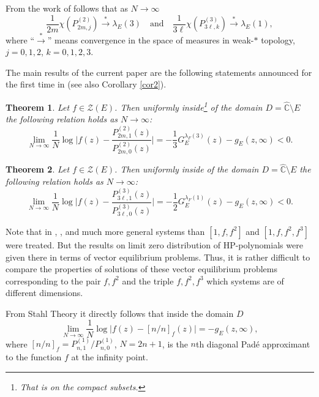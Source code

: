\documentclass[11pt, a4paper, twoside]{article}
\let\myh\widehat
\def\CC{\mathbb C}
\theoremstyle{plain}
\newtheorem{theorem}{Theorem}
\theoremstyle{definition}
\begin{document}
From the work of \cite{ApLy10} follows that as $N\to\infty$
$$
\frac1{2m}\chi(P^{(2)}_{2m,j})\overset{*}\longrightarrow
\lambda_E(3)\quad\text{and}\quad
\frac1{3\ell}\chi(P^{(3)}_{3\ell,k})\overset{*}\longrightarrow
\lambda_E(1),
$$
where ``$\overset{*}\longrightarrow$'' means convergence in the space of measures in weak-$*$ topology, $j=0,1,2$, $k=0,1,2,3$.

The main results of the current paper are the following statements announced for the first time in \cite{DoIkKnSu23} (see also Corollary \ref{cor2}).

\begin{theorem}\label{the1}
Let $f\in\mathscr Z(E)$. Then uniformly inside\footnote{That is on the compact subsets.} of the domain $D=\myh{\CC}\setminus{E}$
the following relation holds as $N\to\infty$: 
\begin{equation}
\lim_{N\to\infty}\frac1N\log\biggl| f(z)-\frac{P^{(2)}_{2m,1}(z)}{P^{(2)}_{2m,0}(z)}\biggr| = -\frac13G^{\lambda_F(3)}_E(z)-g_E(z,\infty)<0.
\label{hp2conv}
\end{equation}
\end{theorem}

\begin{theorem}\label{the2}
Let $f\in\mathscr Z(E)$. Then uniformly inside of the domain $D=\myh{\CC}\setminus{E}$
the following relation holds as $N\to\infty$: 
\begin{equation}
\lim_{N\to\infty}\frac1N\log\biggl|f(z)-\frac{P^{(3)}_{3\ell,1}(z)} {P^{(3)}_{3\ell,0}(z)}\biggr| =-\frac12G^{\lambda_F(1)}_E(z)-g_E(z,\infty)<0.
\label{hp3conv}
\end{equation}
\end{theorem}

Note that in \cite{GoRa81}, \cite{GoRaSo97}, \cite{ApLy10} and \cite{ApLy21} much more  general systems than $[1,f,f^2]$ and $[1,f,f^2,f^3]$ were treated. But the results on limit zero distribution of HP-polynomials  were given there in terms of  vector equilibrium problems. Thus, it is rather difficult to compare the properties of solutions of these vector equilibrium problems corresponding to the pair $f,f^2$ and the triple $f,f^2,f^3$ which systems are of different dimensions. 

From Stahl Theory \cite {Sta97b} it directly follows that inside the domain  $D$
\begin{equation}
\lim_{N\to\infty}\frac1N\log
\bigl|f(z)-[n/n]_f(z)\bigr|=-g_E(z,\infty),
\label{padeconv}
\end{equation}
where $[n/n]_f=P^{(1)}_{n,1}/P^{(1)}_{n,0}$, $N=2n+1$, is the $n$th diagonal Padé approximant to the function $f$ at the infinity point.
\end{document}
